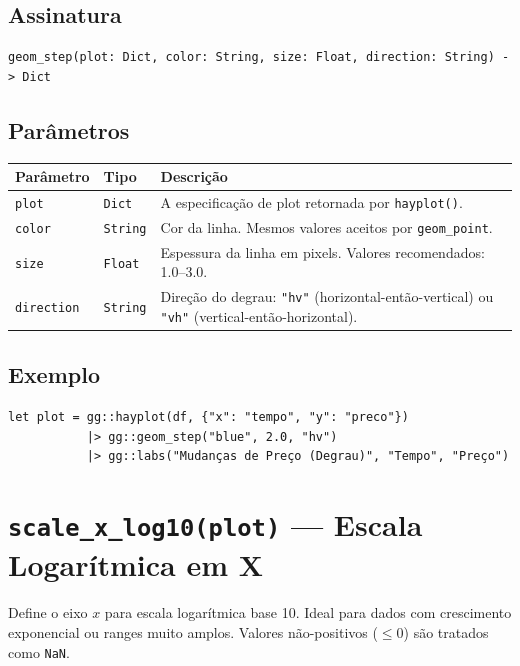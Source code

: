 \documentclass[12pt, a4paper, oneside]{book}
\newcommand{\code}[1]{\texttt{#1}}
\begin{document}
\subsection*{Assinatura}

\begin{lstlisting}[style=inline]
geom_step(plot: Dict, color: String, size: Float, direction: String) -> Dict
\end{lstlisting}

\subsection*{Parâmetros}

\begin{tabularx}{\textwidth}{@{}lL{2.5cm}X@{}}
  \toprule
  \textbf{Parâmetro} & \textbf{Tipo} & \textbf{Descrição} \\
  \midrule
  \code{plot}      & \code{Dict}   & A especificação de plot retornada por \code{hayplot()}. \\[4pt]
  \code{color}     & \code{String} & Cor da linha. Mesmos valores aceitos por \code{geom\_point}. \\[4pt]
  \code{size}      & \code{Float}  & Espessura da linha em pixels. Valores recomendados: 1.0--3.0. \\[4pt]
  \code{direction} & \code{String} & Direção do degrau: \code{"hv"} (horizontal-então-vertical) ou \code{"vh"} (vertical-então-horizontal). \\
  \bottomrule
\end{tabularx}

\subsection*{Exemplo}

\begin{lstlisting}[caption={Gráfico de degrau para preços}]
let plot = gg::hayplot(df, {"x": "tempo", "y": "preco"})
           |> gg::geom_step("blue", 2.0, "hv")
           |> gg::labs("Mudanças de Preço (Degrau)", "Tempo", "Preço")
\end{lstlisting}

\section{\texttt{scale\_x\_log10(plot)} --- Escala Logarítmica em X}

Define o eixo $x$ para escala logarítmica base 10. Ideal para dados com crescimento exponencial
ou ranges muito amplos. Valores não-positivos ($\le 0$) são tratados como \texttt{NaN}.
\end{document}
